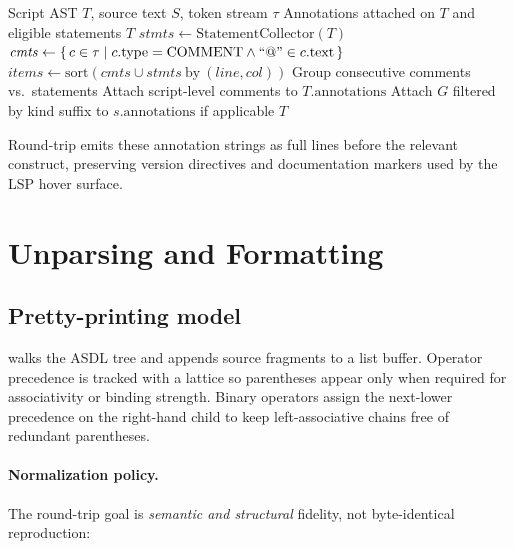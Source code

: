\documentclass[11pt,a4paper]{article}
\begin{document}
\begin{algorithm}[t]
\caption{AnnotationAttachment}
\label{alg:annot}
\begin{algorithmic}[1]
\Require Script AST \(T\), source text \(S\), token stream \(\tau\)
\Ensure Annotations attached on \(T\) and eligible statements
  \State \Return \(T\) 
\EndIf
\State \(\mathit{stmts} \gets \mathrm{StatementCollector}(T)\)
\State \(\mathit{cmts} \gets \{\,c \in \tau \mid c.\mathrm{type}=\mathrm{COMMENT} \land ``@" \in c.\mathrm{text}\,\}\)
\State \(\mathit{items} \gets \mathrm{sort}(\mathit{cmts} \cup \mathit{stmts}\ \mathrm{by}\ (\mathit{line},\mathit{col}))\)
\State Group consecutive comments vs.\ statements
\State Attach script-level  comments to \(T.\mathrm{annotations}\)
  \State Attach \(G\) filtered by kind suffix to \(s.\mathrm{annotations}\) if applicable
\EndFor
\State \Return \(T\)
\end{algorithmic}
\end{algorithm}

Round-trip emits these annotation strings as full lines before the relevant
construct, preserving version directives and documentation markers used by the
LSP hover surface.

\section{Unparsing and Formatting}
\label{sec:unparse}

\subsection{Pretty-printing model}
 walks the ASDL tree and appends source fragments to a list
buffer. Operator precedence is tracked with a  lattice so
parentheses appear only when required for associativity or binding strength.
Binary operators assign the next-lower precedence on the right-hand child to
keep left-associative chains free of redundant parentheses.

\paragraph{Normalization policy.}
The round-trip goal is \emph{semantic and structural} fidelity, not
byte-identical reproduction:
\end{document}

